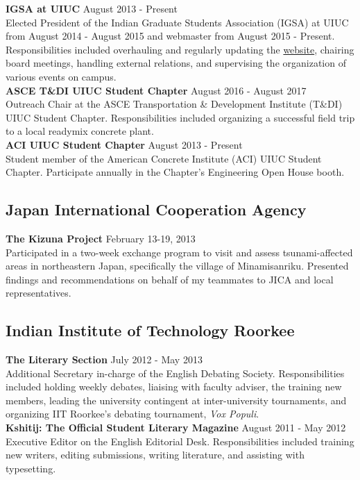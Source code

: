 \documentclass[12pt]{article}
\begin{document}
\textbf{IGSA at UIUC} \hfill August 2013 - Present \\
Elected President of the Indian Graduate Students Association (IGSA) at UIUC from August 2014 - August 2015 and webmaster from August 2015 - Present. Responsibilities included overhauling and regularly updating the \href{http://igsauiuc.com/?i=1}{website}, chairing board meetings, handling external relations, and supervising the organization of various events on campus. \\

\textbf{ASCE T\&DI UIUC Student Chapter} \hfill August 2016 - August 2017 \\
Outreach Chair at the ASCE Transportation \& Development Institute (T\&DI) UIUC Student Chapter. Responsibilities included organizing a successful field trip to a local readymix concrete plant. \\

\textbf{ACI UIUC Student Chapter} \hfill August 2013 - Present \\
Student member of the American Concrete Institute (ACI) UIUC Student Chapter. Participate annually in the Chapter's Engineering Open House booth. \\

\subsection*{Japan International Cooperation Agency}
\textbf{The Kizuna Project} \hfill February 13-19, 2013\\
Participated in a two-week exchange program to visit and assess tsunami-affected areas in northeastern Japan, specifically the village of Minamisanriku. Presented findings and recommendations on behalf of my teammates to JICA and local representatives. \\

\subsection*{Indian Institute of Technology Roorkee}
\textbf{The Literary Section} \hfill July 2012 - May 2013\\
Additional Secretary in-charge of the English Debating Society. Responsibilities included holding weekly debates, liaising with faculty adviser, the training new members, leading the university contingent at inter-university tournaments, and organizing IIT Roorkee's debating tournament, \textit{Vox Populi}. \\

\textbf{Kshitij: The Official Student Literary Magazine} \hfill August 2011 - May 2012\\
Executive Editor on the English Editorial Desk. Responsibilities included training new writers, editing submissions, writing literature, and assisting with typesetting. \\
\end{document}
